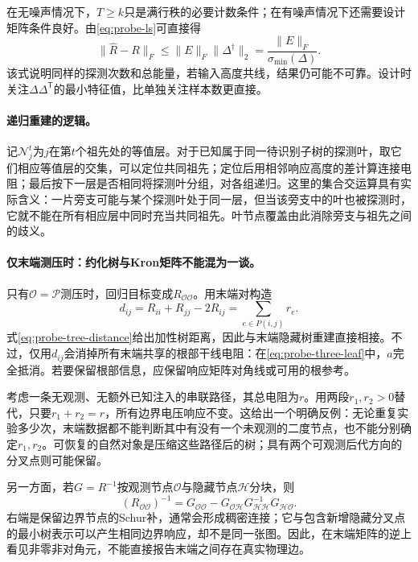 在无噪声情况下，$T\geq k$只是满行秩的必要计数条件；在有噪声情况下还需要设计矩阵条件良好。由\eqref{eq:probe-ls}可直接得
\begin{equation}
 \|\widehat R-R\|_F
 \leq \|E\|_F\|\Delta^\dagger\|_2
 =\frac{\|E\|_F}{\sigma_{\min}(\Delta)}.
 \label{eq:probe-conditioning}
\end{equation}
该式说明同样的探测次数和总能量，若输入高度共线，结果仍可能不可靠。设计时关注$\Delta\Delta^{\mathsf T}$的最小特征值，比单独关注样本数更直接。

\paragraph{递归重建的逻辑。}
记$\mathcal N_j^t$为$j$在第$t$个祖先处的等值层。对于已知属于同一待识别子树的探测叶，取它们相应等值层的交集，可以定位共同祖先；定位后用相邻响应高度的差计算连接电阻；最后按下一层是否相同将探测叶分组，对各组递归。这里的集合交运算具有实际含义：一片旁支可能与某个探测叶处于同一层，但当该旁支中的叶也被探测时，它就不能在所有相应层中同时充当共同祖先。叶节点覆盖由此消除旁支与祖先之间的歧义。

\paragraph{仅末端测压时：约化树与Kron矩阵不能混为一谈。}
只有$\mathcal O=\mathcal P$测压时，回归目标变成$R_{\mathcal O\mathcal O}$。用末端对构造
\begin{equation}
 d_{ij}=R_{ii}+R_{jj}-2R_{ij}
       =\sum_{e\in P(i,j)}r_e.
 \label{eq:probe-tree-distance}
\end{equation}
式\eqref{eq:probe-tree-distance}给出加性树距离，因此与末端隐藏树重建直接相接。不过，仅用$d_{ij}$会消掉所有末端共享的根部干线电阻：在\eqref{eq:probe-three-leaf}中，$a$完全抵消。若要保留根部信息，应保留响应矩阵对角线或可用的根参考。

考虑一条无观测、无额外已知注入的串联路径，其总电阻为$r$。用两段$r_1,r_2>0$替代，只要$r_1+r_2=r$，所有边界电压响应不变。这给出一个明确反例：无论重复实验多少次，末端数据都不能判断其中有没有一个未观测的二度节点，也不能分别确定$r_1,r_2$。可恢复的自然对象是压缩这些路径后的树；具有两个可观测后代方向的分叉点则可能保留。

另一方面，若$G=R^{-1}$按观测节点$\mathcal O$与隐藏节点$\mathcal H$分块，则
\begin{equation}
 (R_{\mathcal O\mathcal O})^{-1}
 =G_{\mathcal O\mathcal O}
  -G_{\mathcal O\mathcal H}G_{\mathcal H\mathcal H}^{-1}
   G_{\mathcal H\mathcal O}.
 \label{eq:probe-kron}
\end{equation}
右端是保留边界节点的Schur补，通常会形成稠密连接；它与包含新增隐藏分叉点的最小树表示可以产生相同边界响应，却不是同一张图。因此，在末端矩阵的逆上看见非零非对角元，不能直接报告末端之间存在真实物理边。

